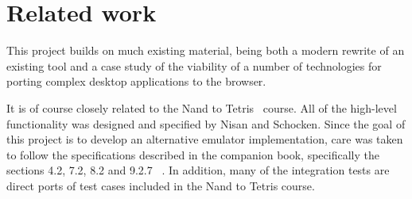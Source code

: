 \section{Related work}

This project builds on much existing material, being both a modern rewrite of an existing tool and a case study of the viability of a number of technologies for porting complex desktop applications to the browser.

It is of course closely related to the Nand to Tetris~\cite{n2tweb} course. All of the high-level functionality was designed and specified by Nisan and Schocken.
Since the goal of this project is to develop an alternative emulator implementation, care was taken to follow the specifications described in the companion book, specifically the sections 4.2, 7.2, 8.2 and 9.2.7  ~\cite{nisan2005}.
In addition, many of the integration tests are direct ports of test cases included in the Nand to Tetris course.


